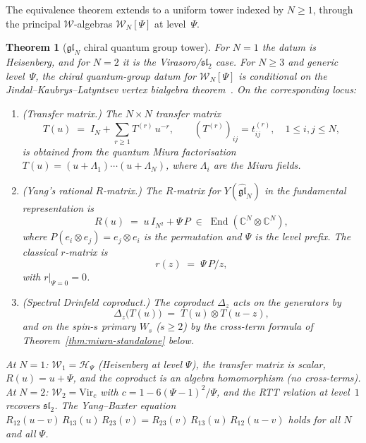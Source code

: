 \documentclass[11pt,reqno]{amsart}
\newtheorem{theorem}{Theorem}[section]
\theoremstyle{definition}
\theoremstyle{remark}
\newcommand{\cH}{\mathcal{H}}
\newcommand{\cW}{\mathcal{W}}
\DeclareMathOperator{\End}{End}
\newcommand{\Vir}{\mathrm{Vir}}
\newcommand{\CC}{\mathbb{C}}
\numberwithin{equation}{section}
\begin{document}
The equivalence theorem extends to a uniform tower indexed by
$N \geq 1$, through the principal $\cW$-algebras
$\cW_N[\Psi]$ at level~$\Psi$.

\begin{theorem}[$\mathfrak{gl}_N$ chiral quantum group tower]
\label{thm:glN-chiral-qg-standalone}
For $N=1$ the datum is Heisenberg, and for $N=2$ it is the
Virasoro/$\mathfrak{sl}_2$ case. For $N\geq3$ and generic
level~$\Psi$, the chiral quantum-group datum for
$\cW_N[\Psi]$ is conditional on the Jindal--Kaubrys--Latyntsev vertex
bialgebra theorem~\cite{JKL26}. On the corresponding locus:
\begin{enumerate}[label=\textup{(\roman*)}]
\item \textup{(Transfer matrix.)}
  The $N \times N$ transfer matrix
  \begin{equation}\label{eq:glN-transfer-standalone}
    T(u)
    \;=\; I_N + \sum_{r \geq 1} T^{(r)}\, u^{-r},
    \qquad
    (T^{(r)})_{ij} = t_{ij}^{(r)},
    \quad 1 \leq i,j \leq N,
  \end{equation}
  is obtained from the quantum Miura factorisation
  $T(u) = (u + \Lambda_1) \cdots (u + \Lambda_N)$,
  where $\Lambda_i$ are the Miura fields.

\item \textup{(Yang's rational $R$-matrix.)}
  The $R$-matrix for $Y(\widehat{\mathfrak{gl}}_N)$
  in the fundamental representation is
  \begin{equation}\label{eq:yang-r-matrix-standalone}
    R(u)
    \;=\; u\, I_{N^2} + \Psi\, P
    \;\in\; \End(\CC^N \otimes \CC^N),
  \end{equation}
  where $P(e_i \otimes e_j) = e_j \otimes e_i$ is the
  permutation and $\Psi$ is the level prefix. The classical
  $r$-matrix is
  \begin{equation}\label{eq:classical-r-glN}
    r(z)
    \;=\;
    \Psi\, P/z,
  \end{equation}
  with $r|_{\Psi = 0} = 0$.

\item \textup{(Spectral Drinfeld coproduct.)}
  The coproduct $\Delta_z$ acts on the generators by
  \begin{equation}\label{eq:glN-coproduct}
    \Delta_z\bigl(T(u)\bigr)
    \;=\;
    T(u) \otimes T(u - z),
  \end{equation}
  and on the spin-$s$ primary $W_s$ ($s \geq 2$) by
  the cross-term formula of
  Theorem~\textup{\ref{thm:miura-standalone}} below.
\end{enumerate}
At $N = 1$: $\cW_1 = \cH_\Psi$ (Heisenberg at level $\Psi$),
the transfer matrix is scalar, $R(u) = u + \Psi$, and the
coproduct is an algebra homomorphism (no cross-terms).
At $N = 2$: $\cW_2 = \Vir_c$ with
$c = 1 - 6(\Psi - 1)^2/\Psi$, and the RTT relation at level~$1$
recovers $\mathfrak{sl}_2$. The Yang--Baxter equation
$R_{12}(u-v)\, R_{13}(u)\, R_{23}(v)
= R_{23}(v)\, R_{13}(u)\, R_{12}(u-v)$
holds for all $N$ and all $\Psi$.
\end{theorem}
\end{document}
